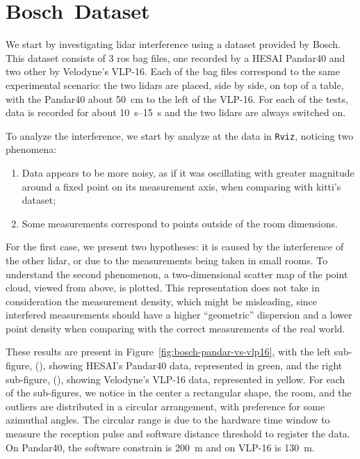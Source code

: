 

\section{Bosch\cp~Dataset}
We start by investigating \ac{lidar} interference using a dataset provided by Bosch. This dataset consists of 3 \ac{ros} bag files, one recorded by a HESAI Pandar40 and two other by Velodyne's VLP-16. Each of the bag files correspond to the same experimental scenario: the two \acp{lidar} are placed, side by side, on top of a table, with the Pandar40 about \SI{50}{\centi\meter} to the left of the VLP-16. For each of the tests, data is recorded for about \SIrange{10}{15}{\second} and the two \acp{lidar} are always switched on.

To analyze the interference, we start by analyze at the data in \texttt{Rviz}, noticing two phenomena: 

\begin{enumerate}
\item Data appears to be more noisy, as if it was oscillating with greater magnitude around a fixed point on its measurement axis, when comparing with \ac{kitti}'s dataset;
\item Some measurements correspond to points outside of the room dimensions.
\end{enumerate}

For the first case, we present two hypotheses: it is caused by the interference of the other \ac{lidar}, or due to the measurements being taken in small rooms. To understand the second phenomenon, a two-dimensional scatter map of the point cloud, viewed from above, is plotted. This representation does not take in consideration the measurement density, which might be misleading, since interfered measurements should have a higher ``geometric'' dispersion and a lower point density when comparing with the correct measurements of the real world.

These results are present in Figure~\ref{fig:bosch-pandar-vs-vlp16}, with the left sub-figure, (), showing HESAI's Pandar40 data, represented in green, and the right sub-figure, (), showing Velodyne's VLP-16 data, represented in yellow. For each of the sub-figures, we notice in the center a rectangular shape, the room, and the outliers are distributed in a circular arrangement, with preference for some azimuthal angles. The circular range is due to the hardware time window to measure the reception pulse and software distance threshold to register the data. On Pandar40, the software constrain is \SI{200}{\meter} and on VLP-16 is \SI{130}{\meter}. 

